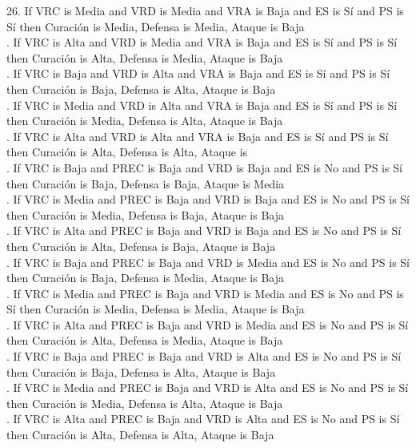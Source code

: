 {26. If VRC is Media and VRD is Media and VRA is Baja and ES is Sí and PS is Sí then Curación is Media, Defensa is Media, Ataque is Baja\\. If VRC is Alta and VRD is Media and VRA is Baja and ES is Sí and PS is Sí then Curación is Alta, Defensa is Media, Ataque is Baja\\. If VRC is Baja and VRD is Alta and VRA is Baja and ES is Sí and PS is Sí then Curación is Baja, Defensa is Alta, Ataque is Baja\\. If VRC is Media and VRD is Alta and VRA is Baja and ES is Sí and PS is Sí then Curación is Media, Defensa is Alta, Ataque is Baja\\. If VRC is Alta and VRD is Alta and VRA is Baja and ES is Sí and PS is Sí then Curación is Alta, Defensa is Alta, Ataque is \\. If VRC is Baja and PREC is Baja and VRD is Baja and ES is No and PS is Sí then Curación is Baja, Defensa is Baja, Ataque is Media\\. If VRC is Media and PREC is Baja and VRD is Baja and ES is No and PS is Sí then Curación is Media, Defensa is Baja, Ataque is Baja\\. If VRC is Alta and PREC is Baja and VRD is Baja and ES is No and PS is Sí then Curación is Alta, Defensa is Baja, Ataque is Baja\\. If VRC is Baja and PREC is Baja and VRD is Media and ES is No and PS is Sí then Curación is Baja, Defensa is Media, Ataque is Baja\\. If VRC is Media and PREC is Baja and VRD is Media and ES is No and PS is Sí then Curación is Media, Defensa is Media, Ataque is Baja\\. If VRC is Alta and PREC is Baja and VRD is Media and ES is No and PS is Sí then Curación is Alta, Defensa is Media, Ataque is Baja\\. If VRC is Baja and PREC is Baja and VRD is Alta and ES is No and PS is Sí then Curación is Baja, Defensa is Alta, Ataque is Baja\\. If VRC is Media and PREC is Baja and VRD is Alta and ES is No and PS is Sí then Curación is Media, Defensa is Alta, Ataque is Baja\\. If VRC is Alta and PREC is Baja and VRD is Alta and ES is No and PS is Sí then Curación is Alta, Defensa is Alta, Ataque is Baja
}